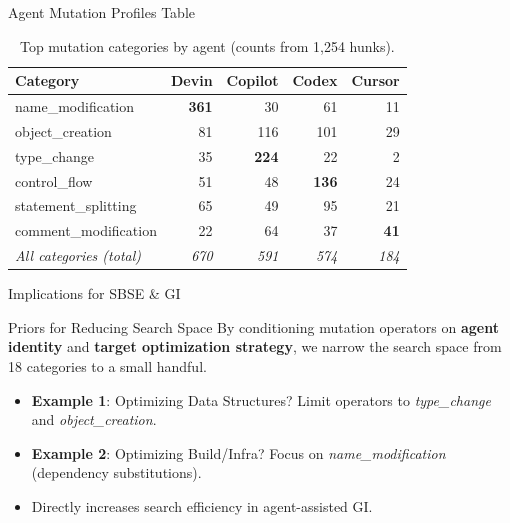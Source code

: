 \documentclass[aspectratio=169]{beamer}
\begin{document}
\begin{frame}{Agent Mutation Profiles Table}
  \begin{table}
    \centering\footnotesize
    \begin{tabular}{lrrrr}
      \toprule
      \textbf{Category} & \textbf{Devin} & \textbf{Copilot} & \textbf{Codex} & \textbf{Cursor} \\
      \midrule
      name\_modification    & \textbf{361} &  30 &  61 & 11 \\
      object\_creation      &  81 & 116 & 101 & 29 \\
      type\_change          &  35 & \textbf{224} &  22 &  2 \\
      control\_flow         &  51 &  48 & \textbf{136} & 24 \\
      statement\_splitting  &  65 &  49 &  95 & 21 \\
      comment\_modification &  22 &  64 &  37 & \textbf{41} \\
      \midrule
      \textit{All categories (total)} & \textit{670} & \textit{591} & \textit{574} & \textit{184} \\
      \bottomrule
    \end{tabular}
    \caption{Top mutation categories by agent (counts from 1,254 hunks).}
  \end{table}
\end{frame}

\begin{frame}{Implications for SBSE \& GI}
  \begin{block}{Priors for Reducing Search Space}
    By conditioning mutation operators on \textbf{agent identity} and \textbf{target optimization strategy}, we narrow the search space from 18 categories to a small handful.
  \end{block}
  
  \begin{itemize}
    \item \textbf{Example 1}: Optimizing Data Structures? Limit operators to \emph{type\_change} and \emph{object\_creation}.
    \item \textbf{Example 2}: Optimizing Build/Infra? Focus on \emph{name\_modification} (dependency substitutions).
    \item Directly increases search efficiency in agent-assisted GI.
  \end{itemize}
\end{frame}
\end{document}
